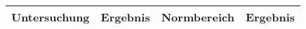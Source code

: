\begin{longtable}{x{4cm} x{2cm} x{5.5cm} x{3cm}}
    \small \textbf{Untersuchung} & \small \textbf{Ergebnis} & \small \textbf{Normbereich} & \small \textbf{Ergebnis} \\ \toprule
    \endhead %
\end{longtable}